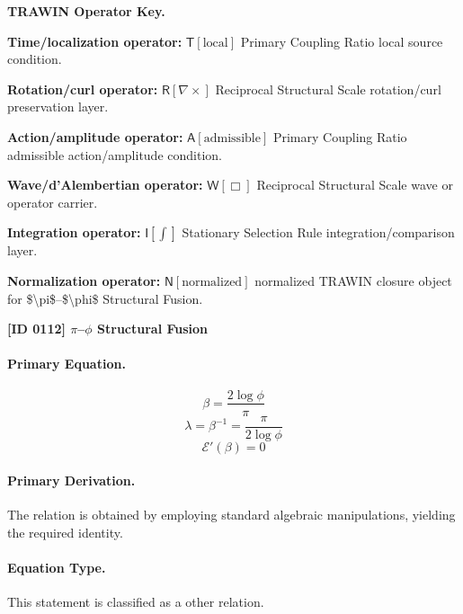 \par\vspace{0.45\baselineskip}
\noindent\begin{minipage}[t]{\linewidth}
\begingroup
\small
\raggedright
\textbf{TRAWIN Operator Key.}\par
\noindent\textbf{Time/localization operator:} $\mathsf{T}\!\left[\mathrm{local}\right]$ Primary Coupling Ratio local source condition.\par
\noindent\textbf{Rotation/curl operator:} $\mathsf{R}\!\left[\nabla\times\right]$ Reciprocal Structural Scale rotation/curl preservation layer.\par
\noindent\textbf{Action/amplitude operator:} $\mathsf{A}\!\left[\mathrm{admissible}\right]$ Primary Coupling Ratio admissible action/amplitude condition.\par
\noindent\textbf{Wave/d'Alembertian operator:} $\mathsf{W}\!\left[\Box\right]$ Reciprocal Structural Scale wave or operator carrier.\par
\noindent\textbf{Integration operator:} $\mathsf{I}\!\left[\int\right]$ Stationary Selection Rule integration/comparison layer.\par
\noindent\textbf{Normalization operator:} $\mathsf{N}\!\left[\mathrm{normalized}\right]$ normalized TRAWIN closure object for \$\textbackslash{}pi\$--\$\textbackslash{}phi\$ Structural Fusion.\par
\endgroup
\end{minipage}

\clearpage
\noindent\textbf{[ID 0112] $\pi$--$\phi$ Structural Fusion}\par
\vspace{0.35em}
\paragraph{Primary Equation.}
\[
\beta = \frac{2\log \phi}{\pi}
\]
\[
\lambda = \beta^{-1} = \frac{\pi}{2\log \phi}
\]
\[
\mathcal{E}'(\beta)=0
\]

\paragraph{Primary Derivation.}
The relation is obtained by employing standard algebraic manipulations, yielding the required identity.
\paragraph{Equation Type.}
This statement is classified as a other relation.

